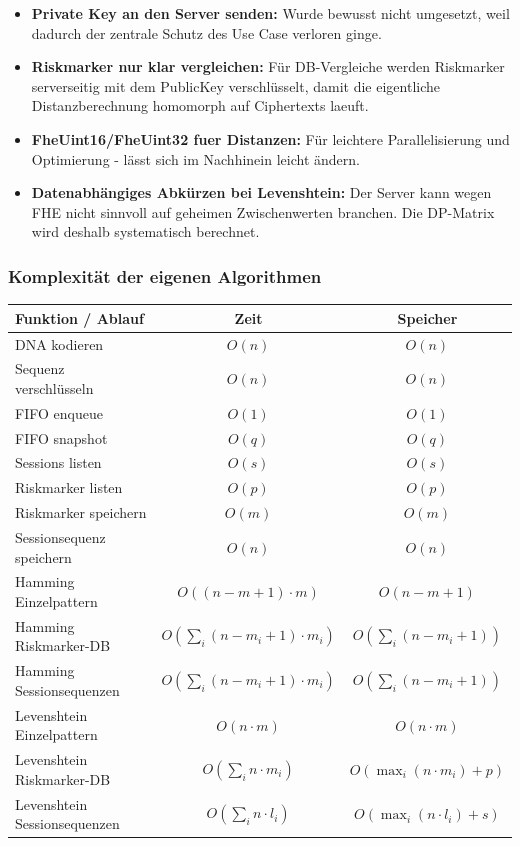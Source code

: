 \begin{itemize}
\item
  \textbf{Private Key an den Server senden:} Wurde bewusst nicht
  umgesetzt, weil dadurch der zentrale Schutz des Use Case verloren
  ginge.
\item
  \textbf{Riskmarker nur klar vergleichen:} Für DB-Vergleiche werden
  Riskmarker serverseitig mit dem PublicKey verschlüsselt, damit die
  eigentliche Distanzberechnung homomorph auf Ciphertexts laeuft.
\item
  \textbf{FheUint16/FheUint32 fuer Distanzen:} Für leichtere Parallelisierung und Optimierung - lässt sich im Nachhinein leicht ändern.
\item
  \textbf{Datenabhängiges Abkürzen bei Levenshtein:} Der Server kann
  wegen FHE nicht sinnvoll auf geheimen Zwischenwerten branchen. Die
  DP-Matrix wird deshalb systematisch berechnet.
\end{itemize}


\subsubsection{Komplexität der eigenen Algorithmen}


\begin{table}[h]
\centering
\begin{tabular}{|p{6.2cm}|c|c|}
\hline
\textbf{Funktion / Ablauf} & \textbf{Zeit} & \textbf{Speicher} \\
\hline
DNA kodieren & $O(n)$ & $O(n)$ \\
\hline
Sequenz verschlüsseln & $O(n)$ & $O(n)$ \\
\hline
FIFO enqueue & $O(1)$ & $O(1)$ \\
\hline
FIFO snapshot & $O(q)$ & $O(q)$ \\
\hline
Sessions listen & $O(s)$ & $O(s)$ \\
\hline
Riskmarker listen & $O(p)$ & $O(p)$ \\
\hline
Riskmarker speichern & $O(m)$ & $O(m)$ \\
\hline
Sessionsequenz speichern & $O(n)$ & $O(n)$ \\
\hline
Hamming Einzelpattern & $O((n - m + 1) \cdot m)$ & $O(n - m + 1)$ \\
\hline
Hamming Riskmarker-DB & $O(\sum_i (n - m_i + 1) \cdot m_i)$ & $O(\sum_i (n - m_i + 1))$ \\
\hline
Hamming Sessionsequenzen & $O(\sum_i (n - m_i + 1) \cdot m_i)$ & $O(\sum_i (n - m_i + 1))$ \\
\hline
Levenshtein Einzelpattern & $O(n \cdot m)$ & $O(n \cdot m)$ \\
\hline
Levenshtein Riskmarker-DB & $O(\sum_i n \cdot m_i)$ & $O(\max_i(n \cdot m_i) + p)$ \\
\hline
Levenshtein Sessionsequenzen & $O(\sum_i n \cdot l_i)$ & $O(\max_i(n \cdot l_i) + s)$ \\
\hline
\end{tabular}
\end{table}



